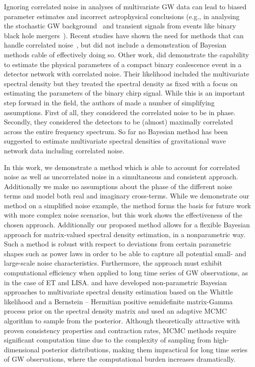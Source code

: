 \documentclass[%
 reprint,
 amsmath,amssymb,
 aps,
 nofootinbib,
]{revtex4-2}
\begin{document}
Ignoring correlated noise in analyses of multivariate \ac{GW} data can lead to biased parameter estimates and incorrect astrophysical conclusions (e.g., in analysing the stochastic \ac{GW} background~\cite{Thrane_correlations_SGWB, Christensen_2019_SGWB, boileau2022figures} and transient signals from events like binary black hole mergers~\cite{Cireddu:2023:arXiv}). 
Recent studies have shown the need for methods that can handle correlated noise~\cite{Janssens2023}, but did not include a demonstration of Bayesian methods cable of effectively doing so. Other work, \cite{Cireddu:2023:arXiv} did demonstrate the capability to estimate the physical parameters of a compact binary coalescence event in a detector network with correlated noise. Their likelihood included the multivariate spectral density but they treated the spectral density as fixed with a focus on estimating the parameters of the binary chirp signal.  While this is an important step forward in the field, the authors of \cite{Cireddu:2023:arXiv} made a number of simplifying assumptions. First of all, they considered the correlated noise to be in phase. Secondly, they considered the detectors to be (almost) maximally correlated across the entire frequency spectrum. So far no Bayesian method has been suggested to estimate  multivariate spectral densities  of gravitational wave network data including correlated noise.

In this work, we demonstrate a method which is able to account for correlated noise as well as uncorrelated noise in a simultaneous and consistent approach. Additionally we make no assumptions about the phase of the different noise terms and model both real and imaginary cross-terms. While we demonstrate our method on a simplified noise example, the method forms the basis for future work with more complex noise scenarios, but this work shows the effectiveness of the chosen approach.
Additionally our proposed method allows for
 a flexible Bayesian approach for matrix-valued spectral density estimation, in a nonparametric way. Such a method is robust with respect to deviations from certain parametric shapes such as power laws in order to be able to capture all potential small- and large-scale noise characteristics.
Furthermore, the approach must exhibit computational efficiency when applied to long time series of \ac{GW} observations, as in the case of ET and LISA. 
\citet{MeierAlexander2020Bnao} and \citet{Liu2023} have developed non-parametric Bayesian approaches to multivariate spectral density estimation based on the Whittle likelihood and a Bernstein -- Hermitian positive semidefinite matrix-Gamma process prior on the spectral density matrix and used an adaptive MCMC algorithm to sample from the posterior. 
Although theoretically attractive with proven consistency properties and contraction rates, MCMC methods require significant computation time due to the complexity of sampling from high-dimensional posterior distributions, making them impractical for long time series of \ac{GW} observations, where the computational burden increases dramatically.
\end{document}
